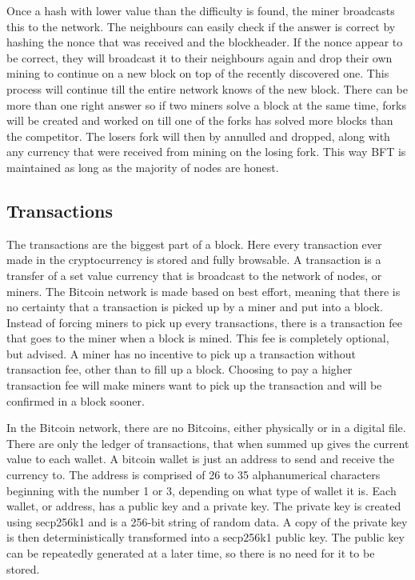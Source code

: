 \documentclass[11pt]{article}
\begin{document}
Once a hash with lower value than the difficulty is found, the miner broadcasts this to the network. The neighbours can easily check if the answer is correct by hashing the nonce that was received and the blockheader. If the nonce appear to be correct, they will broadcast it to their neighbours again and drop their own mining to continue on a new block on top of the recently discovered one. This process will continue till the entire network knows of the new block. There can be more than one right answer so if two miners solve a block at the same time, forks will be created and worked on till one of the forks has solved more blocks than the competitor. The losers fork will then by annulled and dropped, along with any currency that were received from mining on the losing fork. This way BFT is maintained as long as the majority of nodes are honest.

\subsection{Transactions}

The transactions are the biggest part of a block. Here every transaction ever made in the cryptocurrency is stored and fully browsable. A transaction is a transfer of a set value currency that is broadcast to the network of nodes, or miners. The Bitcoin network is made based on best effort, meaning that there is no certainty that a transaction is picked up by a miner and put into a block. Instead of forcing miners to pick up every transactions, there is a transaction fee that goes to the miner when a block is mined. This fee is completely optional, but advised. A miner has no incentive to pick up a transaction without transaction fee, other than to fill up a block. Choosing to pay a higher transaction fee will make miners want to pick up the transaction and will be confirmed in a block sooner. 

In the Bitcoin network, there are no Bitcoins, either physically or in a digital file. There are only the ledger of transactions, that when summed up gives the current value to each wallet. A bitcoin wallet is just an address to send and receive the currency to. The address is comprised of 26 to 35 alphanumerical characters beginning with the number 1 or 3, depending on what type of wallet it is. Each wallet, or address, has a public key and a private key. The private key is created using secp256k1\cite{sigalg} and is a 256-bit string of random data. A copy of the private key is then deterministically transformed into a secp256k1 public key. The public key can be repeatedly generated at a later time, so there is no need for it to be stored. 
\end{document}
